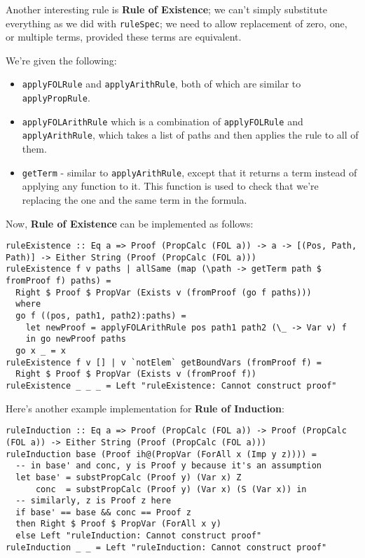 \documentclass{article}
\begin{document}
Another interesting rule is \textbf{Rule of Existence}; we can't simply substitute everything as we did with \texttt{ruleSpec}; we need to allow replacement of zero, one, or multiple terms, provided these terms are equivalent.

We're given the following:

\begin{itemize}
\item \texttt{applyFOLRule} and \texttt{applyArithRule}, both of which are similar to \texttt{applyPropRule}.
\item \texttt{applyFOLArithRule} which is a combination of \texttt{applyFOLRule} and \texttt{applyArithRule}, which takes a list of paths and then applies the rule to all of them.
\item \texttt{getTerm} - similar to \texttt{applyArithRule}, except that it returns a term instead of applying any function to it. This function is used to check that we're replacing the one and the same term in the formula.
\end{itemize}

Now, \textbf{Rule of Existence} can be implemented as follows:

\begin{lstlisting}
ruleExistence :: Eq a => Proof (PropCalc (FOL a)) -> a -> [(Pos, Path, Path)] -> Either String (Proof (PropCalc (FOL a)))
ruleExistence f v paths | allSame (map (\path -> getTerm path $ fromProof f) paths) =
  Right $ Proof $ PropVar (Exists v (fromProof (go f paths)))
  where
  go f ((pos, path1, path2):paths) =
    let newProof = applyFOLArithRule pos path1 path2 (\_ -> Var v) f
    in go newProof paths
  go x _ = x
ruleExistence f v [] | v `notElem` getBoundVars (fromProof f) =
  Right $ Proof $ PropVar (Exists v (fromProof f))
ruleExistence _ _ _ = Left "ruleExistence: Cannot construct proof"
\end{lstlisting}

Here's another example implementation for \textbf{Rule of Induction}:

\begin{lstlisting}
ruleInduction :: Eq a => Proof (PropCalc (FOL a)) -> Proof (PropCalc (FOL a)) -> Either String (Proof (PropCalc (FOL a)))
ruleInduction base (Proof ih@(PropVar (ForAll x (Imp y z)))) =
  -- in base' and conc, y is Proof y because it's an assumption
  let base' = substPropCalc (Proof y) (Var x) Z
      conc  = substPropCalc (Proof y) (Var x) (S (Var x)) in
  -- similarly, z is Proof z here
  if base' == base && conc == Proof z
  then Right $ Proof $ PropVar (ForAll x y)
  else Left "ruleInduction: Cannot construct proof"
ruleInduction _ _ = Left "ruleInduction: Cannot construct proof"
\end{lstlisting}
\end{document}
